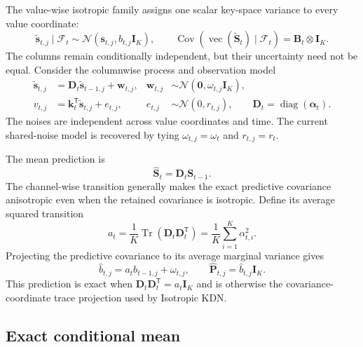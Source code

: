 \documentclass[11pt]{article}
\newcommand{\ve}[1]{\boldsymbol{#1}}
\newcommand{\tr}{\mathsf{T}}
\newcommand{\diag}{\operatorname{diag}}
\newcommand{\Cov}{\operatorname{Cov}}
\newcommand{\Tr}{\operatorname{Tr}}
\newcommand{\Normal}{\mathcal{N}}
\begin{document}
The value-wise isotropic family assigns one scalar key-space variance to every value coordinate:
\begin{equation}
  \widetilde{\ve{s}}_{t,j}\mid\mathcal{F}_t
  \sim\Normal(\ve{s}_{t,j},b_{t,j}\ve{I}_K),
  \qquad
  \Cov\!\left(\operatorname{vec}(\widetilde{\ve{S}}_t)\mid\mathcal{F}_t\right)
  =\ve{B}_t\otimes\ve{I}_K.
  \label{eq:value-family}
\end{equation}
The columns remain conditionally independent, but their uncertainty need not be equal.  Consider
the columnwise process and observation model
\begin{equation}
\begin{aligned}
  \widetilde{\ve{s}}_{t,j}
  &=\ve{D}_t\widetilde{\ve{s}}_{t-1,j}+\ve{w}_{t,j},
  &
  \ve{w}_{t,j}&\sim\Normal(\ve{0},\omega_{t,j}\ve{I}_K),
  \\
  v_{t,j}
  &=\ve{k}_t^{\tr}\widetilde{\ve{s}}_{t,j}+e_{t,j},
  &
  e_{t,j}&\sim\Normal(0,r_{t,j}),
  \qquad
  \ve{D}_t=\diag(\ve{\alpha}_t).
\end{aligned}
  \label{eq:value-state-space}
\end{equation}
The noises are independent across value coordinates and time.  The current shared-noise model is
recovered by tying $\omega_{t,j}=\omega_t$ and $r_{t,j}=r_t$.

The mean prediction is
\begin{equation}
  \widehat{\ve{S}}_t=\ve{D}_t\ve{S}_{t-1}.
  \label{eq:value-mean-prediction}
\end{equation}
The channel-wise transition generally makes the exact predictive covariance anisotropic even
when the retained covariance is isotropic.  Define its average squared transition
\begin{equation}
  a_t=\frac{1}{K}\Tr(\ve{D}_t\ve{D}_t^{\tr})
  =\frac{1}{K}\sum_{i=1}^{K}\alpha_{t,i}^2.
  \label{eq:value-transition-average}
\end{equation}
Projecting the predictive covariance to its average marginal variance gives
\begin{equation}
  \widehat b_{t,j}=a_tb_{t-1,j}+\omega_{t,j},
  \qquad
  \widehat{\ve{P}}_{t,j}=\widehat b_{t,j}\ve{I}_K.
  \label{eq:value-prediction}
\end{equation}
This prediction is exact when
$\ve{D}_t\ve{D}_t^{\tr}=a_t\ve{I}_K$ and is otherwise the covariance-coordinate trace
projection used by Isotropic KDN.

\subsection{Exact conditional mean}
\end{document}
